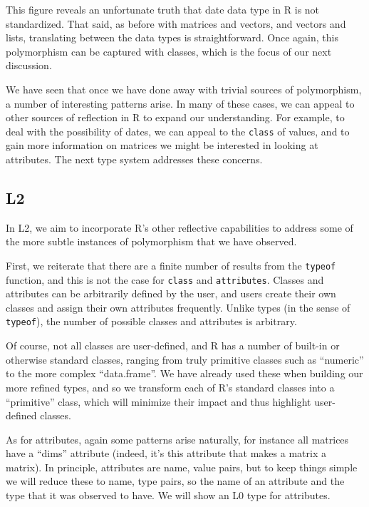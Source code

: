 \documentclass[acmsmall,10pt,review,anonymous]{acmart}\settopmatter{printfolios=true,printccs=false,printacmref=false}
\newcommand{\code}[1]{\lstinline|#1|\xspace}
\begin{document}
This figure reveals an unfortunate truth that date data type in R is not standardized.
That said, as before with matrices and vectors, and vectors and lists, translating between the data types is straightforward.
Once again, this polymorphism can be captured with classes, which is the focus of our next discussion.

We have seen that once we have done away with trivial sources of polymorphism, a number of interesting patterns arise.
In many of these cases, we can appeal to other sources of reflection in R to expand our understanding.
For example, to deal with the possibility of dates, we can appeal to the \code{class} of values, and to gain more information on matrices we might be interested in looking at attributes.
The next type system addresses these concerns.

%
%
%
%
\subsection{L2}

In L2, we aim to incorporate R's other reflective capabilities to address some of the more subtle instances of polymorphism that we have observed.

First, we reiterate that there are a finite number of results from the {\tt typeof} function, and this is not the case for \code{class} and \code{attributes}.
Classes and attributes can be arbitrarily defined by the user, and users create their own classes and assign their own attributes frequently.
Unlike types (in the sense of \code{typeof}), the number of possible classes and attributes is arbitrary.

Of course, not all classes are user-defined, and R has a number of built-in or otherwise standard classes, ranging from truly primitive classes such as ``numeric'' to the more complex ``data.frame''.
We have already used these when building our more refined types, and so we transform each of R's standard classes into a ``primitive'' class, which will minimize their impact and thus highlight user-defined classes.

As for attributes, again some patterns arise naturally, for instance all matrices have a ``dims'' attribute (indeed, it's this attribute that makes a matrix a matrix).
In principle, attributes are name, value pairs, but to keep things simple we will reduce these to name, type pairs, so the name of an attribute and the type that it was observed to have.
We will show an L0 type for attributes.
\end{document}
